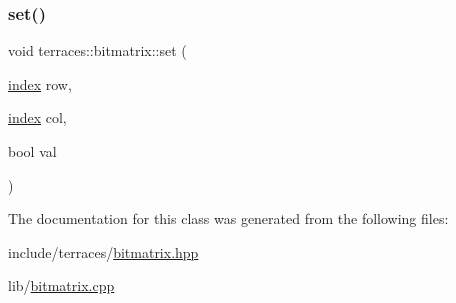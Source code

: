 \mbox{\label{classterraces_1_1bitmatrix_abced1ac3b008ea34b2917e5a4b82a7d4}} 
\subsubsection{\texorpdfstring{set()}{set()}}
{\footnotesize\ttfamily void terraces\+::bitmatrix\+::set (\begin{DoxyParamCaption}\item[{\hyperlink{namespaceterraces_adbc33ccb543d1634e96d0eb02e472c77}{index}}]{row,  }\item[{\hyperlink{namespaceterraces_adbc33ccb543d1634e96d0eb02e472c77}{index}}]{col,  }\item[{bool}]{val }\end{DoxyParamCaption})}



The documentation for this class was generated from the following files\+:\begin{DoxyCompactItemize}
\item 
include/terraces/\hyperlink{bitmatrix_8hpp}{bitmatrix.\+hpp}\item 
lib/\hyperlink{lib_2bitmatrix_8cpp}{bitmatrix.\+cpp}\end{DoxyCompactItemize}
